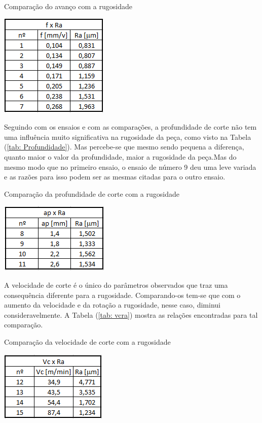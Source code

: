 \documentclass[deposito, acronym, symbols]{fei}
\begin{document}
\begin{table}[!htb]
 \centering
    \caption{Comparação do avanço com a rugosidade}
    \includegraphics[width=0.3\linewidth]{Imagens/fxra.png}
    \label{tab: Anvanço}
 \end{table}

Seguindo com os ensaios e com as comparações, a profundidade de corte não tem uma influência muito significativa na rugosidade da peça, como visto na Tabela (\ref{tab: Profundidade}). Mas percebe-se que mesmo sendo pequena a diferença, quanto maior o valor da profundidade, maior a rugosidade da peça.Mas do mesmo modo que no primeiro ensaio, o ensaio de número 9 deu uma leve variada e as razões para isso podem ser as mesmas citadas para o outro ensaio.

\begin{table}[!htb]
 \centering
    \caption{Comparação da profundidade de corte com a rugosidade}
    \includegraphics[width=0.3\linewidth]{Imagens/apxra.png}
    \label{tab: Profundidade}
 \end{table}

A velocidade de corte é o único do parâmetros observados que traz uma consequência diferente para a rugosidade. Comparando-os tem-se que com o aumento da velocidade e da rotação a rugosidade, nesse caso, diminui consideravelmente. A Tabela (\ref{tab: vcra}) mostra as relações encontradas para tal comparação.

\begin{table}[!htb]
 \centering
    \caption{Comparação da velocidade de corte com a rugosidade }
    \includegraphics[width=0.3\linewidth]{Imagens/Vcxra2.png}
    \label{tab: vcra}
 \end{table}
\end{document}
